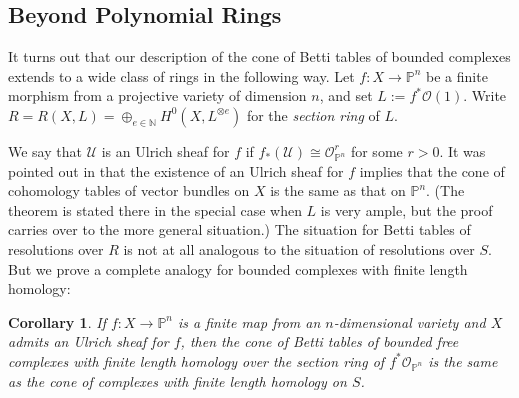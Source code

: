\documentclass[12pt]{amsart}
\newtheorem{cor}[lemma]{Corollary}
\theoremstyle{definition}
\theoremstyle{remark}
\newcommand{\PP}{\mathbb{P}}
\newcommand{\cO}{\mathcal{O}}
\newcommand{\cU}{\mathcal{U}}
\newcommand{\defi}[1]{\textsf{#1}} %
\renewcommand{\P}{{\mathbb P}}
\begin{document}
\subsection*{Beyond Polynomial Rings}
It turns out that our description of the cone of Betti tables of bounded complexes
extends to a wide class of rings in the following way. Let $f:X\to \PP^{n}$ be a finite
morphism from a projective variety of dimension $n$, and set $L:=f^*\cO(1)$. 
Write $R=R(X,L)=\oplus_{e\in \mathbb N} H^0(X,L^{\otimes e})$ for the \emph{section ring}
of $L$.

We say that $\cU$ is an \defi{Ulrich sheaf} for $f$ if $f_*(\cU)\cong \cO_{\PP^n}^r$ for some $r>0$.  It was pointed out in \cite[Theorem~5]{eis-schrey-abel} that the existence of an Ulrich sheaf for $f$ implies that  the cone of cohomology tables of vector bundles on $X$ is the same as that on $\PP^{n}$. (The theorem is stated there in the special case when $L$ is very ample, but the proof
carries over to the more general situation.) The situation for Betti tables of resolutions over $R$ is not at all analogous to the situation of resolutions over $S$. But we prove a complete analogy for bounded complexes with finite length homology:

\begin{cor}\label{cor:isom cones}
If $f:X\to \P^{n}$ is a  finite map from an $n$-dimensional variety and $X$ admits an Ulrich sheaf for $f$, then the cone of Betti tables
of bounded free complexes with finite length homology over  the section ring
of $f^{*}\cO_{\P^{n}}$ is the same
as the cone of complexes with finite length homology  on $S$. 
\end{cor}
\end{document}

